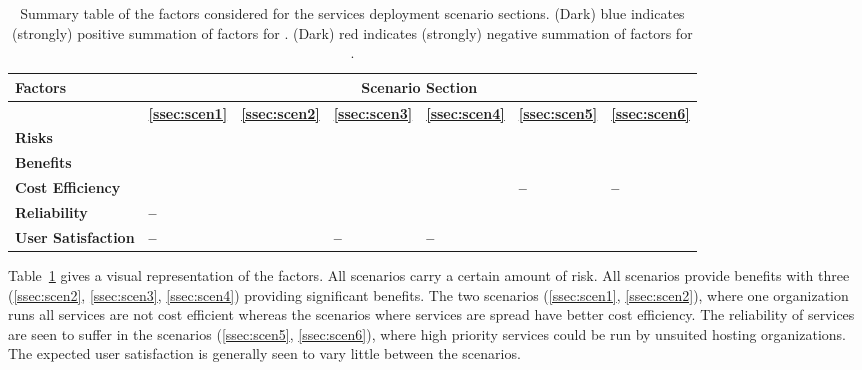 \documentclass[12pt,a4paper]{article}
\newcommand{\cmark}{\ding{51}}%
\newcommand{\xmark}{\ding{55}}%
\newcommand{\SP}{\cellcolor{green!75} \bf \cmark} %
\newcommand{\MP}{\cellcolor{green!50} \bf \cmark} %
\newcommand{\NU}{\cellcolor{yellow!25} \bf --} %
\newcommand{\MN}{\cellcolor{red!50} \bf \xmark} %
\newcommand{\SN}{\cellcolor{red!75} \bf \xmark} %
\newcommand{\SP}{\cellcolor{blue!75} \bf \hspace{\facc\colwid}\cmark} %
\newcommand{\MP}{\cellcolor{blue!25} \bf \hspace{\facc\colwid}\cmark} %
\newcommand{\NU}{\cellcolor{yellow!25} \bf \hspace{\facc\colwid}--} %
\newcommand{\MN}{\cellcolor{red!25} \bf \hspace{\facc\colwid}\xmark} %
\newcommand{\SN}{\cellcolor{red!75} \bf \hspace{\facc\colwid}\xmark} %
\begin{document}
\begin{table} \centering
\begin{tabular}{p{5cm}|p{\colwid} p{\colwid} p{\colwid} p{\colwid} p{\colwid} p{\colwid}}
{\bf \Large Factors}& \multicolumn{6}{c}{\bf \Large \bf Scenario Section} \\[\pdd] %
  \hline
           & \bf \hspace{\faccc\colwid}\ref{ssec:scen1} & 
             \bf \hspace{\faccc\colwid}\ref{ssec:scen2} & 
             \bf \hspace{\faccc\colwid}\ref{ssec:scen3} & 
             \bf \hspace{\faccc\colwid}\ref{ssec:scen4} & 
             \bf \hspace{\faccc\colwid}\ref{ssec:scen5} & 
             \bf \hspace{\faccc\colwid}\ref{ssec:scen6} \\[\pdd]
\large \bf Risks             & \SN & \SN & \SN & \MN & \SN & \SN
\\[\pdd]
\large \bf Benefits          & \MP & \SP & \SP & \SP & \MP & \MP
\\[\pdd]
\large \bf Cost Efficiency   & \MN & \SN & \MP & \MP & \NU & \NU
\\[\pdd]
\large \bf Reliability       & \NU & \MP & \MP & \MP & \MN & \MN
\\[\pdd]
\large \bf User Satisfaction & \NU & \MN & \NU & \NU & \MN & \MN
\end{tabular}
\caption{Summary table of the factors considered for the \ED services deployment scenario sections. (Dark) blue indicates (strongly) positive summation of factors for \ED. (Dark) red indicates (strongly) negative summation of factors for \ED.}
\label{tab:summary}
\end{table}


Table~\ref{tab:summary} gives a visual representation of the factors.
All scenarios carry a certain amount of risk.
All scenarios provide benefits with three (\ref{ssec:scen2}, \ref{ssec:scen3}, \ref{ssec:scen4}) providing significant benefits.
The two scenarios (\ref{ssec:scen1}, \ref{ssec:scen2}), where one organization runs all services are not cost efficient whereas the scenarios where services are spread have better cost efficiency.
The reliability of services are seen to suffer in the scenarios (\ref{ssec:scen5}, \ref{ssec:scen6}), where high priority services could be run by unsuited hosting organizations.
The expected user satisfaction is generally seen to vary little between the scenarios.
\end{document}
